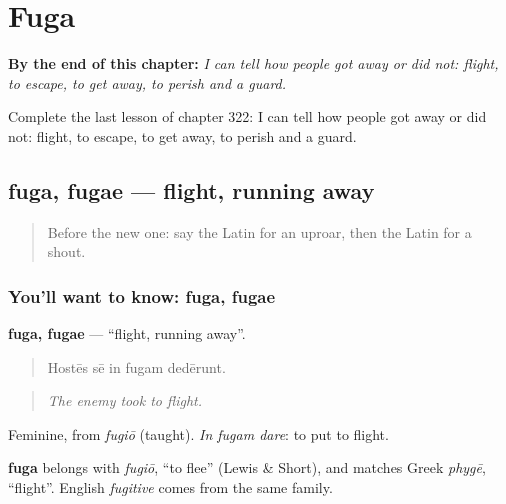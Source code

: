 
\chapter{Fuga}
\label{ch:la-fuga}

\begin{chapteropening}
\textbf{By the end of this chapter:} \emph{I can tell how people got away or did not: flight, to escape, to get away, to perish and a guard.}

Complete the last lesson of chapter 322: I can tell how people got away or did not: flight, to escape, to get away, to perish and a guard.
\end{chapteropening}

\section[fuga, fugae]{fuga, fugae — flight, running away}

\label{lesson:LA-C322-fuga}



\begin{quote}
Before the new one: say the Latin for an uproar, then the Latin for a shout.
\end{quote}

\subsection*{You'll want to know: fuga, fugae}
\textbf{fuga, fugae} — \textquotedblleft{}flight, running away\textquotedblright{}.

\begin{quote}
Hostēs sē in fugam dedērunt.
\end{quote}

\begin{quote}
\emph{The enemy took to flight.}
\end{quote}

Feminine, from \emph{fugiō} (taught). \emph{In fugam dare}: to put to flight.

\begin{cousinweb}
\textbf{fuga} belongs with \emph{fugiō}, \textquotedblleft{}to flee\textquotedblright{} (Lewis \& Short), and matches Greek \emph{phygē}, \textquotedblleft{}flight\textquotedblright{}. English \emph{fugitive} comes from the same family.
\end{cousinweb}

